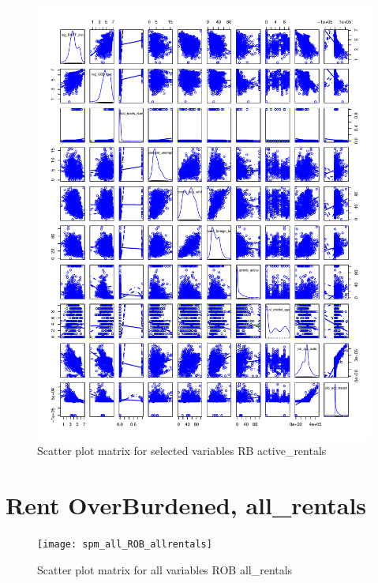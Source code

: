 \documentclass[10pt, letterpaper]{amsart}
\begin{document}
\begin{figure}[H]
  \caption{Scatter plot matrix for selected variables RB active\_rentals}
  \includegraphics[scale=0.6]{spm_selected_RB_activerentals}
\end{figure}



\newpage
\section{Rent OverBurdened, all\_rentals}

\begin{figure}[!h]
  \caption{Scatter plot matrix for all variables ROB all\_rentals}
  \texttt{[image: spm\_all\_ROB\_allrentals]}
\end{figure}
\end{document}
